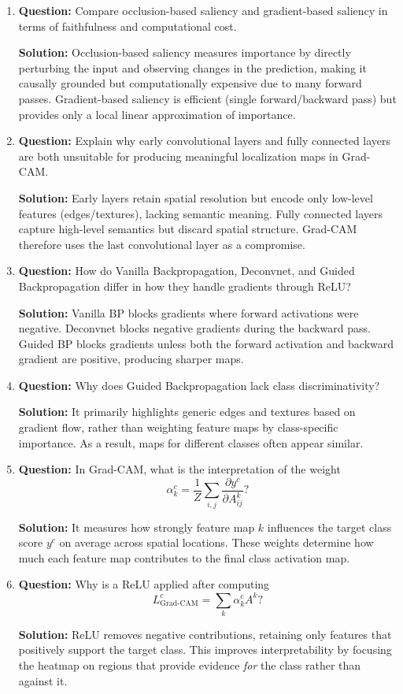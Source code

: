 \documentclass{article}
\begin{document}
\begin{enumerate}

\item \textbf{Question:}
Compare occlusion-based saliency and gradient-based saliency in terms of
faithfulness and computational cost.

\textbf{Solution:}
Occlusion-based saliency measures importance by directly perturbing the input
and observing changes in the prediction, making it causally grounded but
computationally expensive due to many forward passes.  
Gradient-based saliency is efficient (single forward/backward pass) but
provides only a local linear approximation of importance.

\item \textbf{Question:}
Explain why early convolutional layers and fully connected layers are both
unsuitable for producing meaningful localization maps in Grad-CAM.

\textbf{Solution:}
Early layers retain spatial resolution but encode only low-level features
(edges/textures), lacking semantic meaning.  
Fully connected layers capture high-level semantics but discard spatial
structure.  
Grad-CAM therefore uses the last convolutional layer as a compromise.

\item \textbf{Question:}
How do Vanilla Backpropagation, Deconvnet, and Guided Backpropagation differ
in how they handle gradients through ReLU?

\textbf{Solution:}
Vanilla BP blocks gradients where forward activations were negative.  
Deconvnet blocks negative gradients during the backward pass.  
Guided BP blocks gradients unless both the forward activation and backward
gradient are positive, producing sharper maps.

\item \textbf{Question:}
Why does Guided Backpropagation lack class discriminativity?

\textbf{Solution:}
It primarily highlights generic edges and textures based on gradient flow,
rather than weighting feature maps by class-specific importance.  
As a result, maps for different classes often appear similar.

\item \textbf{Question:}
In Grad-CAM, what is the interpretation of the weight
\[
\alpha_k^c = \frac{1}{Z} \sum_{i,j} \frac{\partial y^c}{\partial A_{ij}^k} ?
\]

\textbf{Solution:}
It measures how strongly feature map $k$ influences the target class score
$y^c$ on average across spatial locations.  
These weights determine how much each feature map contributes to the final
class activation map.

\item \textbf{Question:}
Why is a ReLU applied after computing
\[
L_{\text{Grad-CAM}}^c = \sum_k \alpha_k^c A^k ?
\]

\textbf{Solution:}
ReLU removes negative contributions, retaining only features that positively
support the target class.  
This improves interpretability by focusing the heatmap on regions that provide
evidence \emph{for} the class rather than against it.

\end{enumerate}
\end{document}
